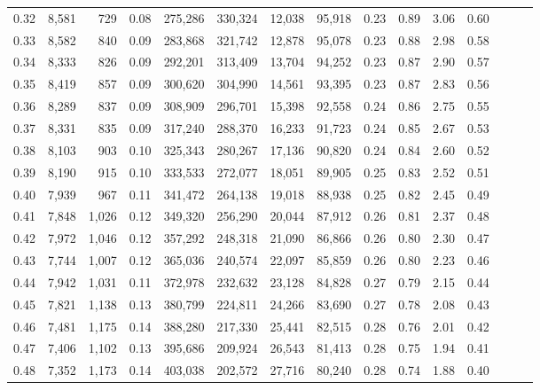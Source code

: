 \begin{tabular}{rrrrrrrrrrrrrrr}
0.32 &  8,581 &    729 &  0.08 &  275,286 &  330,324 &   12,038 &   95,918 &  0.23 &  0.89 &  3.06 &      0.60 \\
0.33 &  8,582 &    840 &  0.09 &  283,868 &  321,742 &   12,878 &   95,078 &  0.23 &  0.88 &  2.98 &      0.58 \\
0.34 &  8,333 &    826 &  0.09 &  292,201 &  313,409 &   13,704 &   94,252 &  0.23 &  0.87 &  2.90 &      0.57 \\
0.35 &  8,419 &    857 &  0.09 &  300,620 &  304,990 &   14,561 &   93,395 &  0.23 &  0.87 &  2.83 &      0.56 \\
0.36 &  8,289 &    837 &  0.09 &  308,909 &  296,701 &   15,398 &   92,558 &  0.24 &  0.86 &  2.75 &      0.55 \\
0.37 &  8,331 &    835 &  0.09 &  317,240 &  288,370 &   16,233 &   91,723 &  0.24 &  0.85 &  2.67 &      0.53 \\
0.38 &  8,103 &    903 &  0.10 &  325,343 &  280,267 &   17,136 &   90,820 &  0.24 &  0.84 &  2.60 &      0.52 \\
0.39 &  8,190 &    915 &  0.10 &  333,533 &  272,077 &   18,051 &   89,905 &  0.25 &  0.83 &  2.52 &      0.51 \\
0.40 &  7,939 &    967 &  0.11 &  341,472 &  264,138 &   19,018 &   88,938 &  0.25 &  0.82 &  2.45 &      0.49 \\
0.41 &  7,848 &  1,026 &  0.12 &  349,320 &  256,290 &   20,044 &   87,912 &  0.26 &  0.81 &  2.37 &      0.48 \\
0.42 &  7,972 &  1,046 &  0.12 &  357,292 &  248,318 &   21,090 &   86,866 &  0.26 &  0.80 &  2.30 &      0.47 \\
0.43 &  7,744 &  1,007 &  0.12 &  365,036 &  240,574 &   22,097 &   85,859 &  0.26 &  0.80 &  2.23 &      0.46 \\
0.44 &  7,942 &  1,031 &  0.11 &  372,978 &  232,632 &   23,128 &   84,828 &  0.27 &  0.79 &  2.15 &      0.44 \\
0.45 &  7,821 &  1,138 &  0.13 &  380,799 &  224,811 &   24,266 &   83,690 &  0.27 &  0.78 &  2.08 &      0.43 \\
0.46 &  7,481 &  1,175 &  0.14 &  388,280 &  217,330 &   25,441 &   82,515 &  0.28 &  0.76 &  2.01 &      0.42 \\
0.47 &  7,406 &  1,102 &  0.13 &  395,686 &  209,924 &   26,543 &   81,413 &  0.28 &  0.75 &  1.94 &      0.41 \\
0.48 &  7,352 &  1,173 &  0.14 &  403,038 &  202,572 &   27,716 &   80,240 &  0.28 &  0.74 &  1.88 &      0.40 \\

\end{tabular}
